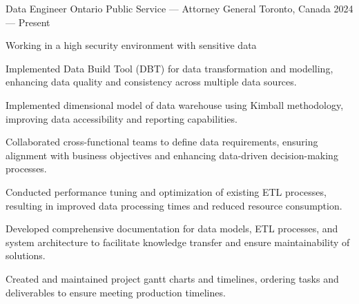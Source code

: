 

\begin{cventries}

\cventry%
  {Data Engineer}
  {Ontario Public Service --- Attorney General}
  {Toronto, Canada}
  {2024 --- Present}
  {
    \begin{cvitems}
      \item Working in a high security environment with sensitive data
      \item Implemented Data Build Tool (DBT) for data transformation and modelling, enhancing data quality and consistency across multiple data sources.
      \item Implemented dimensional model of data warehouse using Kimball methodology, improving data accessibility and reporting capabilities.
      \item Collaborated  cross-functional teams to define data requirements, ensuring alignment with business objectives and enhancing data-driven decision-making processes.
      \item Conducted performance tuning and optimization of existing ETL processes, resulting in improved data processing times and reduced resource consumption.
      \item Developed comprehensive documentation for data models, ETL processes, and system architecture to facilitate knowledge transfer and ensure maintainability of solutions.
      \item Created and maintained project gantt charts and timelines, ordering tasks and deliverables to ensure meeting production timelines.
    \end{cvitems}
  }


\end{cventries}
